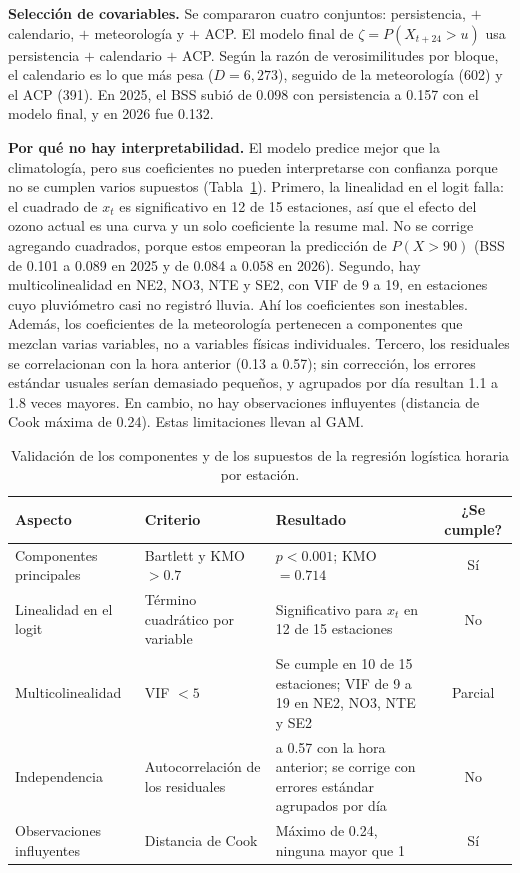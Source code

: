 \documentclass[11pt]{article}
\begin{document}
\textbf{Selección de covariables.} Se compararon cuatro conjuntos: persistencia, $+$ calendario, $+$ meteorología y $+$ ACP. El modelo final de $\zeta = P(X_{t+24}>u)$ usa persistencia $+$ calendario $+$ ACP. Según la razón de verosimilitudes por bloque, el calendario es lo que más pesa ($D=6{,}273$), seguido de la meteorología (602) y el ACP (391). En 2025, el BSS subió de 0.098 con persistencia a 0.157 con el modelo final, y en 2026 fue 0.132.

\textbf{Por qué no hay interpretabilidad.} El modelo predice mejor que la climatología, pero sus coeficientes no pueden interpretarse con confianza porque no se cumplen varios supuestos (Tabla~\ref{tab:supuestos}). Primero, la linealidad en el logit falla: el cuadrado de $x_t$ es significativo en 12 de 15 estaciones, así que el efecto del ozono actual es una curva y un solo coeficiente la resume mal. No se corrige agregando cuadrados, porque estos empeoran la predicción de $P(X>90)$ (BSS de 0.101 a 0.089 en 2025 y de 0.084 a 0.058 en 2026). Segundo, hay multicolinealidad en NE2, NO3, NTE y SE2, con VIF de 9 a 19, en estaciones cuyo pluviómetro casi no registró lluvia. Ahí los coeficientes son inestables. Además, los coeficientes de la meteorología pertenecen a componentes que mezclan varias variables, no a variables físicas individuales. Tercero, los residuales se correlacionan con la hora anterior (0.13 a 0.57); sin corrección, los errores estándar usuales serían demasiado pequeños, y agrupados por día resultan 1.1 a 1.8 veces mayores. En cambio, no hay observaciones influyentes (distancia de Cook máxima de 0.24). Estas limitaciones llevan al GAM.

\begin{table}[!htbp]
\centering
\caption{Validación de los componentes y de los supuestos de la regresión logística horaria por estación.}
\label{tab:supuestos}
\small
\begin{tabularx}{\textwidth}{>{\raggedright\arraybackslash}p{2.9cm}>{\raggedright\arraybackslash}p{3.1cm}>{\raggedright\arraybackslash}Xc}
\toprule
Aspecto & Criterio & Resultado & ¿Se cumple? \\
\midrule
Componentes principales & Bartlett y KMO $>0.7$ & $p<0.001$; KMO $=0.714$ & Sí \\
Linealidad en el logit & Término cuadrático por variable & Significativo para $x_t$ en 12 de 15 estaciones & No \\
Multicolinealidad & VIF $<5$ & Se cumple en 10 de 15 estaciones; VIF de 9 a 19 en NE2, NO3, NTE y SE2 & Parcial \\
Independencia & Autocorrelación de los residuales & 0.13 a 0.57 con la hora anterior; se corrige con errores estándar agrupados por día & No \\
Observaciones influyentes & Distancia de Cook & Máximo de 0.24, ninguna mayor que 1 & Sí \\
\bottomrule
\end{tabularx}
\end{table}
\end{document}
